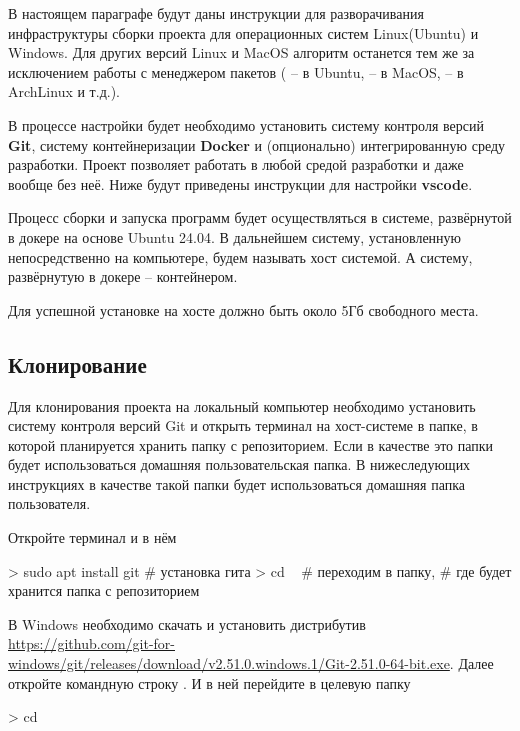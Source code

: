 В настоящем параграфе будут даны инструкции для разворачивания инфраструктуры сборки проекта
для операционных систем Linux(Ubuntu) и Windows.
Для других версий Linux и MacOS алгоритм останется тем же за исключением работы с менеджером пакетов ( -- в Ubuntu,  -- в MacOS,  -- в ArchLinux и т.д.).

В процессе настройки будет необходимо установить систему контроля версий {\bf Git},
систему контейнеризации {\bf Docker} и (опционально) интегрированную среду разработки.
Проект позволяет работать в любой средой разработки и даже вообще без неё.
Ниже будут приведены инструкции для настройки {\bf vscode}.

Процесс сборки и запуска программ будет осуществляться в системе, развёрнутой в докере на основе Ubuntu 24.04.
В дальнейшем систему, установленную непосредственно на компьютере, будем называть хост системой.
А систему, развёрнутую в докере -- контейнером.

Для успешной установке на хосте должно быть около 5Гб свободного места.

\subsection{Клонирование}
Для клонирования проекта на локальный компьютер необходимо установить систему контроля версий Git
и открыть терминал на хост-системе в папке, в которой планируется хранить папку с репозиторием.
Если в качестве это папки будет использоваться домашняя пользовательская папка.
В нижеследующих инструкциях в качестве такой папки будет использоваться домашняя папка пользователя.

\begin{center}

\begin{tcolorbox}[osstyle, title=Ubuntu]
Откройте терминал и в нём
\begin{shelloutput}
> sudo apt install git  # установка гита
> cd ~                  # переходим в папку,
                        # где будет хранится папка с репозиторием
\end{shelloutput}
\end{tcolorbox}

\begin{tcolorbox}[osstyle, title=Windows]
В Windows необходимо скачать и установить дистрибутив
\url{https://github.com/git-for-windows/git/releases/download/v2.51.0.windows.1/Git-2.51.0-64-bit.exe}.
Далее откройте командную строку . И в ней перейдите в целевую папку
\begin{shelloutput}
> cd %
\end{shelloutput}
\end{tcolorbox}

\end{center}

